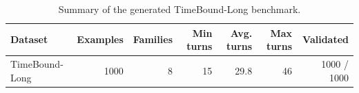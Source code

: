 \begin{table}[t]
\centering
\small
\begin{tabular}{lrrrrrr}
\toprule
Dataset & Examples & Families & Min turns & Avg. turns & Max turns & Validated \\
\midrule
TimeBound-Long & 1000 & 8 & 15 & 29.8 & 46 & 1000 / 1000 \\
\bottomrule
\end{tabular}
\caption{Summary of the generated TimeBound-Long benchmark.}
\label{tab:timebound_generation_stats}
\end{table}
